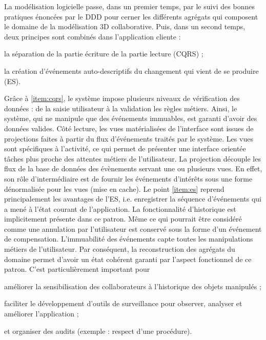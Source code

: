 La modélisation logicielle passe, 
dans un premier temps, par le suivi des bonnes pratiques énoncées par le 
\gls{DDD} pour cerner les différents agrégats qui composent le domaine de la 
modélisation 3D collaborative. 
Puis, dans un second temps, deux principes sont combinés dans l'application 
cliente : 
\begin{enumerate*}[label=(\roman*)]
	\item \label{item:cqrs}la séparation de la partie écriture de la partie lecture 
	(\gls{CQRS}) ;
	\item \label{item:es} la création d'événements auto-descriptifs du changement 
	qui vient de se 
	produire (\gls{ES}).
\end{enumerate*}
Grâce à \ref{item:cqrs}, le système impose plusieurs niveaux de vérification des données : de 
la saisie utilisateur à la validation les règles métiers. Ainsi, le système, qui ne 
manipule que des événements immuables, est garanti d'avoir des données valides.
Côté lecture, les vues matérialisées de l'interface sont issues de projections faites 
à partir du flux d'événements traités par le système. Les vues sont spécifiques à 
l'activité, ce qui permet de présenter une interface orientée tâches plus proche des 
attentes métiers de l'utilisateur. La projection découple les flux de la base 
de données des évènements servant une ou plusieurs vues. En effet, son rôle 
d'intermédiaire est de fournir les événements d'intérêts sous une forme 
dénormalisée pour les vues (mise en cache).
Le point \ref{item:es} reprend principalement les avantages de l'\gls{ES}, i.e. 
enregistrer la 
séquence d'événements qui a mené à l'état courant de l'application. La 
fonctionnalité d'historique est implicitement présente dans ce patron. Même ce qui 
pourrait être considéré comme une \og annulation\fg{} par l'utilisateur est conservé 
sous la forme d'un événement de compensation. L'immuabilité des événements 
capte toutes les manipulations métiers de l'utilisateur. Par conséquent, la 
reconstruction des agrégats du domaine permet d'avoir un état cohérent garanti 
par l'aspect fonctionnel de ce patron. C'est particulièrement important pour 
\begin{enumerate*}[label=(\roman*)]
	\item améliorer la sensibilisation des collaborateurs à l'historique des objets 
	manipulés ;
	\item faciliter le développement d'outils de surveillance pour observer, analyser 
	et améliorer l'application ;
	\item et organiser des audits (exemple : respect d'une procédure).
\end{enumerate*}
%

